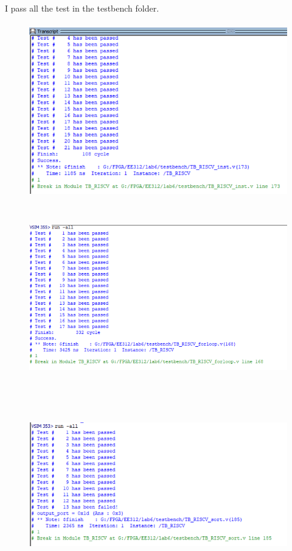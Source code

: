 \documentclass[12pt,a4paper]{article}
\begin{document}
I pass all the test in the testbench folder.

\begin{figure}[H]
  \centering
  \includegraphics[height=3in]{inst.png}
  \end{figure}

\begin{figure}[H]
  \centering
  \includegraphics[height=3in]{forloop.png}
  \end{figure}

  \begin{figure}[H]
    \centering
    \includegraphics[height=3in]{sort.png}
    \end{figure}
\end{document}
